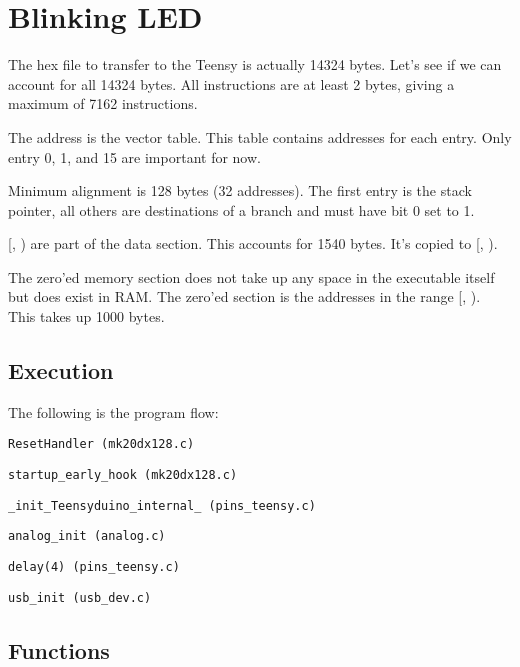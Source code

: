 \newpage
\section{Blinking LED}

The hex file to transfer to the Teensy is actually 14324 bytes.
Let's see if we can account for all 14324 bytes.
All instructions are at least 2 bytes, giving a maximum of 7162 instructions.

The address  is the vector table. This table contains
addresses for each entry. Only entry 0, 1, and 15 are important for now.

Minimum alignment is 128 bytes (32 addresses). The first entry is the stack
pointer, all others are destinations of a branch and must have bit 0 set to 1.

[, ) are part of the data
section. This accounts for 1540 bytes. It's copied to
[, ).

The zero'ed memory section does not take up any space in the executable itself
but does exist in RAM. The zero'ed section is the addresses in the range
[, ).
This takes up 1000 bytes.

\subsection{Execution}

The following is the program flow:

\indent \texttt{ResetHandler (mk20dx128.c)}

\hspace{2mm} \texttt{startup\_early\_hook (mk20dx128.c)}

\hspace{2mm} \texttt{\_init\_Teensyduino\_internal\_ (pins\_teensy.c)}

\hspace{4mm} \texttt{analog\_init (analog.c)}

\hspace{4mm} \texttt{delay(4) (pins\_teensy.c)}

\hspace{4mm} \texttt{usb\_init (usb\_dev.c)}

\subsection{Functions}

